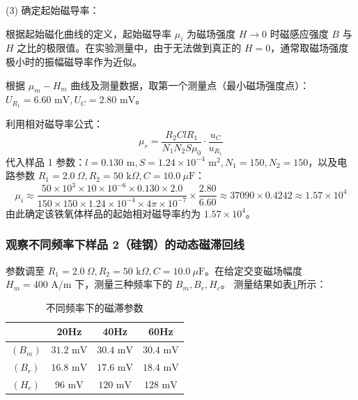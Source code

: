 \documentclass[11pt]{article}
\begin{document}
\noindent (3) 确定起始磁导率：

根据起始磁化曲线的定义，起始磁导率 $\mu_i$ 为磁场强度 $H \to 0$ 时磁感应强度 $B$ 与 $H$ 之比的极限值。在实验测量中，由于无法做到真正的 $H=0$，通常取磁场强度极小时的振幅磁导率作为近似。

根据 $\mu_m - H_m$ 曲线及测量数据，取第一个测量点（最小磁场强度点）：
$U_{R_1} = 6.60\text{ mV}, U_C = 2.80\text{ mV}$。

利用相对磁导率公式：
\begin{equation}
    \mu_r = \frac{R_2 C l R_1}{N_1 N_2 S \mu_0} \cdot \frac{u_C}{u_{R_1}}
\end{equation}
代入样品 1 参数：$l=0.130\text{ m}, S=1.24\times 10^{-4}\text{ m}^2, N_1=150, N_2=150$，以及电路参数 $R_1=2.0\ \Omega, R_2=50\text{ k}\Omega, C=10.0\ \mu\text{F}$：
\begin{equation}
    \mu_i \approx \frac{50\times 10^3 \times 10\times 10^{-6} \times 0.130 \times 2.0}{150 \times 150 \times 1.24\times 10^{-4} \times 4\pi \times 10^{-7}} \times \frac{2.80}{6.60} \approx 37090 \times 0.4242 \approx 1.57 \times 10^4
\end{equation}
由此确定该铁氧体样品的起始相对磁导率约为 $1.57 \times 10^4$。




\subsubsection{观察不同频率下样品 2（硅钢）的动态磁滞回线}

参数调至 $R_1=2.0\ \Omega, R_2=50\text{ k}\Omega, C=10.0\ \mu\text{F}$。在给定交变磁场幅度 $H_m=400\text{ A/m}$ 下，测量三种频率下的 $B_m, B_r, H_c$。
测量结果如表\ref{tab:diff_para}所示：
\begin{table}[h!]
    \centering
    \caption{不同频率下的磁滞参数}
    \label{tab:diff_para}
    \renewcommand{\arraystretch}{1.5}
    \begin{tabular}{cccc}
        \toprule
         & 20Hz & 40Hz & 60Hz \\ 
        \midrule
        $(B_m)$ & $31.2\text{ mV}$ & $30.4\text{ mV}$ & $30.4\text{ mV}$ \\
        $(B_r)$ & $16.8\text{ mV}$ & $17.6\text{ mV}$ & $18.4\text{ mV}$ \\
        $(H_c)$ & $96\text{ mV}$ & $120\text{ mV}$ & $128\text{ mV}$ \\
        \bottomrule
    \end{tabular}
\end{table}
\end{document}
